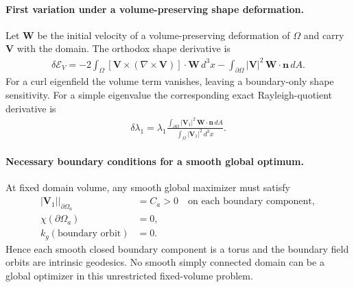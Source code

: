 \paragraph{First variation under a volume-preserving shape deformation.}
Let $\mathbf W$ be the initial velocity of a volume-preserving deformation of
$\Omega$ and carry $\mathbf V$ with the domain.  The orthodox shape derivative
is
\begin{align}
    \delta\mathscr E_V
    =
    -2\int_{\Omega}
    \left[
        \mathbf V\times(\nabla\times\mathbf V)
    \right]\cdot\mathbf W\,d^3x
    -
    \int_{\partial\Omega}
    |\mathbf V|^2\,\mathbf W\cdot\mathbf n\,dA .
    \label{eq:rt_isoperimetric_energy_shape_derivative}
\end{align}
For a curl eigenfield the volume term vanishes, leaving a boundary-only shape
sensitivity.  For a simple eigenvalue the corresponding exact Rayleigh-quotient
derivative is
\begin{align}
    \delta\lambda_1
    =
    \lambda_1
    \frac{
        \int_{\partial\Omega}
        |\mathbf V_1|^2\,\mathbf W\cdot\mathbf n\,dA
    }{
        \int_{\Omega}|\mathbf V_1|^2\,d^3x
    } .
    \label{eq:rt_isoperimetric_eigenvalue_shape_derivative}
\end{align}

\paragraph{Necessary boundary conditions for a smooth global optimum.}
At fixed domain volume, any smooth global maximizer must satisfy
\begin{align}
    \left.|\mathbf V_1|\right|_{\partial\Omega_a}
    &=C_a>0
    \quad\text{on each boundary component},
    \label{eq:rt_isoperimetric_boundary_magnitude}\\
    \chi(\partial\Omega_a)&=0,
    \label{eq:rt_isoperimetric_boundary_euler_characteristic}\\
    k_g(\text{boundary orbit})&=0 .
    \label{eq:rt_isoperimetric_boundary_geodesic}
\end{align}
Hence each smooth closed boundary component is a torus and the boundary field
orbits are intrinsic geodesics.  No smooth simply connected domain can be a
global optimizer in this unrestricted fixed-volume problem.

